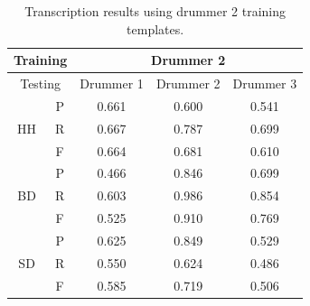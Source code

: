 \documentclass{article}
\begin{document}
\begin{table}[h]
\begin{center}
\begin{tabular}{|c|c|c|c|c|}
\hline
\multicolumn{2}{|c}{Training} & \multicolumn{3}{|c|}{Drummer 2}   \\ \hline
\multicolumn{2}{|c|}{Testing} & Drummer 1 & Drummer 2 & Drummer 3 \\ \hline
\multirow{3}{*}{HH}    & P    & 0.661     & 0.600     & 0.541     \\ \cline{2-5} 
                       & R    & 0.667     & 0.787     & 0.699     \\ \cline{2-5} 
                       & F    & 0.664     & 0.681     & 0.610     \\ \hline
\multirow{3}{*}{BD}    & P    & 0.466     & 0.846     & 0.699     \\ \cline{2-5} 
                       & R    & 0.603     & 0.986     & 0.854     \\ \cline{2-5} 
                       & F    & 0.525     & 0.910     & 0.769     \\ \hline
\multirow{3}{*}{SD}    & P    & 0.625     & 0.849     & 0.529     \\ \cline{2-5} 
                       & R    & 0.550     & 0.624     & 0.486     \\ \cline{2-5} 
                       & F    & 0.585     & 0.719     & 0.506     \\ \hline
\end{tabular}
 \caption{Transcription results using drummer 2 training templates.}
 \label{tab:trainDr2}
\end{center}
\end{table}
\end{document}
